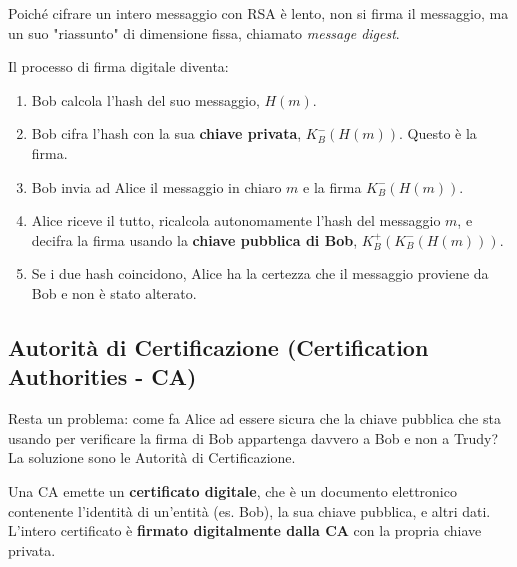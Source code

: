 
Poiché cifrare un intero messaggio con RSA è lento, non si firma il messaggio, ma un suo "riassunto" di dimensione fissa, chiamato \textit{message digest}.


Il processo di firma digitale diventa:
\begin{enumerate}
    \item Bob calcola l'hash del suo messaggio, $H(m)$.
    \item Bob cifra l'hash con la sua \textbf{chiave privata}, $K_B^-(H(m))$. Questo è la firma.
    \item Bob invia ad Alice il messaggio in chiaro $m$ e la firma $K_B^-(H(m))$.
    \item Alice riceve il tutto, ricalcola autonomamente l'hash del messaggio $m$, e decifra la firma usando la \textbf{chiave pubblica di Bob}, $K_B^+(K_B^-(H(m)))$.
    \item Se i due hash coincidono, Alice ha la certezza che il messaggio proviene da Bob e non è stato alterato.
\end{enumerate}

\subsection{Autorità di Certificazione (Certification Authorities - CA)}
Resta un problema: come fa Alice ad essere sicura che la chiave pubblica che sta usando per verificare la firma di Bob appartenga davvero a Bob e non a Trudy? La soluzione sono le Autorità di Certificazione.


Una CA emette un \textbf{certificato digitale}, che è un documento elettronico contenente l'identità di un'entità (es. Bob), la sua chiave pubblica, e altri dati. L'intero certificato è \textbf{firmato digitalmente dalla CA} con la propria chiave privata.

